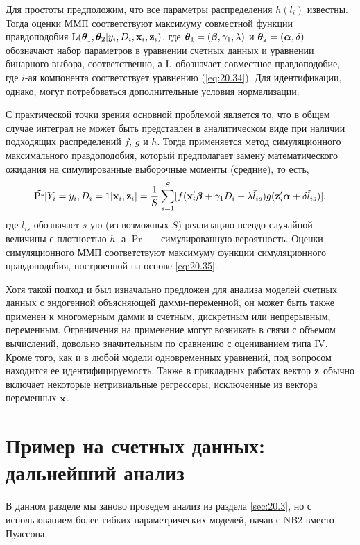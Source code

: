 Для простоты предположим, что все параметры распределения $h(l_i)$ известны. Тогда оценки ММП соответствуют максимуму совместной функции правдоподобия $\mathrm{L}(\bm{\theta}_1, \bm{\theta}_2|y_i, D_i, \mathbf{x}_i, \mathbf{z}_i)$, где $\bm{\theta}_1 = (\bm{\beta}, \gamma_1, \lambda)$ и $\bm{\theta}_2 = (\bm{\alpha}, \delta)$ обозначают набор параметров в уравнении счетных данных и уравнении бинарного выбора, соответственно, а $\mathrm{L}$ обозначает совместное правдоподобие, где $i$-ая компонента соответствует уравнению (\ref{eq:20.34}). Для идентификации, однако, могут потребоваться дополнительные условия нормализации.

С практической точки зрения основной проблемой является то, что в общем случае интеграл не может быть представлен в аналитическом виде при наличии подходящих распределений $f$, $g$ и $h$. Тогда применяется метод симуляционного максимального правдоподобия, который предполагает замену математического ожидания на симулированные выборочные моменты (средние), то есть,
    \begin{align}\label{eq:20.35}
    \tilde{\mathrm{Pr}}[Y_i = y_i, D_i = 1|\mathbf{x}_i, \mathbf{z}_i] = \frac{1}{S} \sum^{S}_{s = 1}[f(\mathbf{x}_i'\bm{\beta} + \gamma_1 D_i +\lambda \tilde{l}_{is})g(\mathbf{z}'_i\bm{\alpha} + \delta\tilde{l}_{is})],
    \end{align}
где $\tilde{l}_{is}$ обозначает $s$-ую (из возможных $S$) реализацию псевдо-случайной величины с плотностью $h$, а $\tilde{\Pr}$ --- симулированную вероятность. Оценки симуляционного ММП соответствуют максимуму функции симуляционного правдоподобия, построенной на основе \ref{eq:20.35}.

Хотя такой подход и был изначально предложен для анализа моделей счетных данных с эндогенной объясняющей дамми-переменной, он может быть также применен к многомерным дамми и счетным, дискретным или непрерывным, переменным. Ограничения на применение могут возникать в связи с объемом вычислений, довольно значительным по сравнению с оцениванием типа IV. Кроме того, как и в любой модели одновременных уравнений, под вопросом находится ее идентифицируемость. Также в прикладных работах вектор $\mathbf{z}$ обычно включает некоторые нетривиальные регрессоры, исключенные из вектора переменных $\mathbf{x}$.




\section{Пример на счетных данных: дальнейший анализ}\label{sec:20.7}

\noindent
В данном разделе мы заново проведем анализ из раздела \ref{sec:20.3}, но с использованием более гибких параметрических моделей, начав с NB2 вместо Пуассона.

